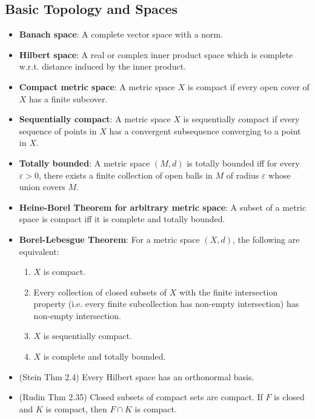 \documentclass[twoside]{article}
\def\eps{\varepsilon}
\begin{document}
\subsection{Basic Topology and Spaces}
\begin{itemize}
\item \textbf{Banach space}: A complete vector space with a norm.

\item \textbf{Hilbert space}: A real or complex inner product space which is complete w.r.t. distance induced by the inner product.

\item \textbf{Compact metric space}: A metric space $X$ is compact if every open cover of $X$ has a finite subcover.

\item \textbf{Sequentially compact}: A metric space $X$ is sequentially compact if every sequence of points in $X$ has a convergent subsequence converging to a point in $X$.

\item \textbf{Totally bounded}: A metric space $(M, d)$ is totally bounded iff for every $\eps > 0$, there exists a finite collection of open balls in $M$ of radius $\eps$ whose union covers $M$.

\item \textbf{Heine-Borel Theorem for arbitrary metric space}: A subset of a metric space is compact iff it is complete and totally bounded.

\item \textbf{Borel-Lebesgue Theorem}: For a metric space $(X, d)$, the following are equivalent:
\begin{enumerate}
\item $X$ is compact.
\item Every collection of closed subsets of $X$ with the finite intersection property (i.e. every finite subcollection has non-empty intersection) has non-empty intersection.
\item $X$ is sequentially compact.
\item $X$ is complete and totally bounded.
\end{enumerate}

\item (Stein Thm 2.4) Every Hilbert space has an orthonormal basis.

\item (Rudin Thm 2.35) Closed subsets of compact sets are compact. If $F$ is closed and $K$ is compact, then $F \cap K$ is compact.


\end{itemize}
\end{document}
